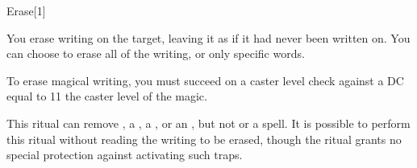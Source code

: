 \begin{spellsection}{Erase}[1]
    \begin{spellheader}
    \end{spellheader}
    \begin{spellcontent}
        \begin{spelltargetinginfo}
        \end{spelltargetinginfo}
        \begin{spelleffects}

            \spelleffect You erase writing on the target, leaving it as if it had never been written on. You can choose to erase all of the writing, or only specific words.

            To erase magical writing, you must succeed on a caster level check against a DC equal to 11 \add the caster level of the magic.
        \end{spelleffects}
    \end{spellcontent}
    \begin{spellfooter}
        \spellnotes This ritual can remove , a , a , or an , but not  or a  spell. It is possible to perform this ritual without reading the writing to be erased, though the ritual grants no special protection against activating such traps.
    \end{spellfooter}
\end{spellsection}

